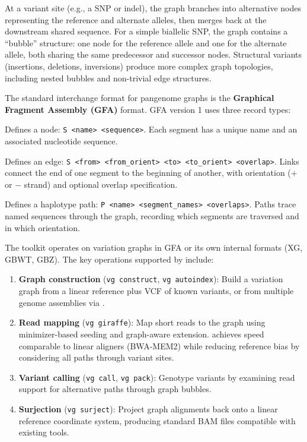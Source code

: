 At a variant site (e.g., a SNP or indel), the graph branches into alternative nodes representing the reference and alternate alleles, then merges back at the downstream shared sequence. For a simple biallelic SNP, the graph contains a ``bubble'' structure: one node for the reference allele and one for the alternate allele, both sharing the same predecessor and successor nodes. Structural variants (insertions, deletions, inversions) produce more complex graph topologies, including nested bubbles and non-trivial edge structures.

The standard interchange format for pangenome graphs is the \textbf{Graphical Fragment Assembly (GFA)} format. GFA version 1 uses three record types:
\begin{description}[style=nextline, itemsep=2pt]
  \item[S (Segment)] Defines a node: \texttt{S <name> <sequence>}. Each segment has a unique name and an associated nucleotide sequence.
  \item[L (Link)] Defines an edge: \texttt{S <from> <from\_orient> <to> <to\_orient> <overlap>}. Links connect the end of one segment to the beginning of another, with orientation ($+$ or $-$ strand) and optional overlap specification.
  \item[P (Path)] Defines a haplotype path: \texttt{P <name> <segment\_names> <overlaps>}. Paths trace named sequences through the graph, recording which segments are traversed and in which orientation.
\end{description}

The  toolkit operates on variation graphs in GFA or its own internal formats (XG, GBWT, GBZ). The key operations supported by  include:

\begin{enumerate}[itemsep=2pt]
  \item \textbf{Graph construction} (\texttt{vg construct}, \texttt{vg autoindex}): Build a variation graph from a linear reference plus VCF of known variants, or from multiple genome assemblies via .
  \item \textbf{Read mapping} (\texttt{vg giraffe}): Map short reads to the graph using minimizer-based seeding and graph-aware extension.  achieves speed comparable to linear aligners (BWA-MEM2) while reducing reference bias by considering all paths through variant sites.
  \item \textbf{Variant calling} (\texttt{vg call}, \texttt{vg pack}): Genotype variants by examining read support for alternative paths through graph bubbles.
  \item \textbf{Surjection} (\texttt{vg surject}): Project graph alignments back onto a linear reference coordinate system, producing standard BAM files compatible with existing tools.
\end{enumerate}

